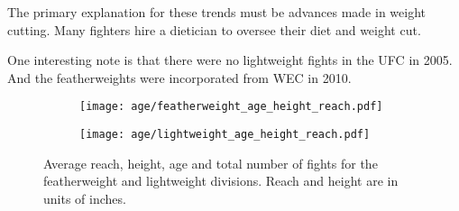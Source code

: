 The primary explanation for these trends must be advances made in
weight cutting. Many fighters hire a dietician to oversee their
diet and weight cut.

One interesting note is that there were no lightweight fights in the UFC
in 2005. And the featherweights were incorporated from WEC in 2010.

\begin{figure}[h]
\begin{center}
\begin{subfigure}{8cm}
\texttt{[image: age/featherweight\_age\_height\_reach.pdf]}
\end{subfigure}
\begin{subfigure}{8cm}
\texttt{[image: age/lightweight\_age\_height\_reach.pdf]}
\end{subfigure}
\caption{Average reach, height, age and total number
of fights
for the featherweight and lightweight divisions.
Reach and height are in units of inches.}
\label{reach_vs_time_light}
\end{center}
\end{figure}

\clearpage
